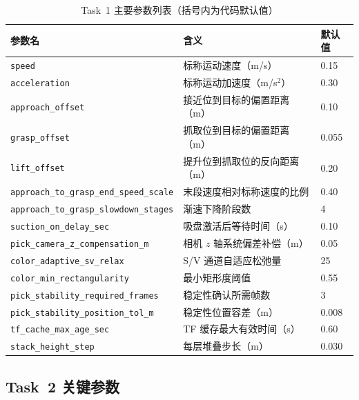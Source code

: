 \documentclass[12pt,a4paper]{article}
\begin{document}
\begin{table}[H]
  \centering
  \caption{Task~1 主要参数列表（括号内为代码默认值）}
  \label{tab:task1_params}
  \small
  \begin{tabularx}{\textwidth}{lXl}
    \toprule
    \textbf{参数名} & \textbf{含义} & \textbf{默认值} \\
    \midrule
    \texttt{speed}                        & 标称运动速度（m/s）                   & 0.15  \\
    \texttt{acceleration}                 & 标称运动加速度（m/s$^2$）             & 0.30  \\
    \texttt{approach\_offset}             & 接近位到目标的偏置距离（m）           & 0.10  \\
    \texttt{grasp\_offset}                & 抓取位到目标的偏置距离（m）           & 0.055 \\
    \texttt{lift\_offset}                 & 提升位到抓取位的反向距离（m）         & 0.20  \\
    \texttt{approach\_to\_grasp\_end\_speed\_scale} & 末段速度相对标称速度的比例   & 0.40  \\
    \texttt{approach\_to\_grasp\_slowdown\_stages}  & 渐速下降阶段数             & 4     \\
    \texttt{suction\_on\_delay\_sec}      & 吸盘激活后等待时间（s）               & 0.10  \\
    \texttt{pick\_camera\_z\_compensation\_m} & 相机 $z$ 轴系统偏差补偿（m）     & 0.05  \\
    \texttt{color\_adaptive\_sv\_relax}   & S/V 通道自适应松弛量                  & 25    \\
    \texttt{color\_min\_rectangularity}   & 最小矩形度阈值                        & 0.55  \\
    \texttt{pick\_stability\_required\_frames} & 稳定性确认所需帧数               & 3     \\
    \texttt{pick\_stability\_position\_tol\_m} & 稳定性位置容差（m）              & 0.008 \\
    \texttt{tf\_cache\_max\_age\_sec}     & TF 缓存最大有效时间（s）              & 0.60  \\
    \texttt{stack\_height\_step}          & 每层堆叠步长（m）                     & 0.030 \\
    \bottomrule
  \end{tabularx}
\end{table}

\subsection{Task~2 关键参数}
\end{document}
